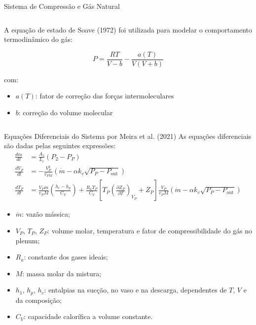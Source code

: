 \begin{frame}{Sistema de Compressão e Gás Natural}
\begin{columns}[T]
\begin{column}{0.52\textwidth}
            \vspace{0.15cm}
            A equação de estado de Soave (1972) foi utilizada para modelar o comportamento termodinâmico do gás:

            \[
            P = \frac{R T}{V - b} - \frac{a(T)}{V(V + b)}
            \]

            com:
            \begin{itemize}
                \item \( a(T) \): fator de correção das forças intermoleculares
                \item \( b \): correção do volume molecular
            \end{itemize}
        \end{column}
    \end{columns}
\end{frame}



\begin{frame}{Equações Diferenciais do Sistema por Meira et al. (2021)}
    As equações diferenciais são dadas pelas seguintes expressões:
    \begin{align}
        \frac{d\dot{m}}{dt} &= \frac{A_1}{L_c}(P_2 - P_P) \tag{1} \\
        \frac{dV_P}{dt} &= -\frac{V_P^2}{v_{PM}} \left( \dot{m} - \alpha k_v \sqrt{P_P - P_{\text{out}}} \right) \tag{2} \\
        \frac{dT_P}{dt} &= \frac{V_P \dot{m}}{v_P M} \left( \frac{h_c - h_p}{C_V} \right)
        + \frac{R_a T_P}{C_V} \left[ T_P \left( \frac{\partial Z_P}{\partial T} \right)_{V_P} + Z_P \right]
        \frac{V_P}{v_P M} \left( \dot{m} - \alpha k_v \sqrt{P_P - P_{\text{out}}} \right) \tag{3}
    \end{align}

    \vspace{0.1cm}

    \begin{itemize}
        \item \( \dot{m} \): vazão mássica;
        \item \( V_P \), \( T_P \), \( Z_P \): volume molar, temperatura e fator de compressibilidade do gás no plenum;
        \item \( R_a \): constante dos gases ideais;
        \item \( M \): massa molar da mistura;
        \item \( h_1 \), \( h_p \), \( h_c \): entalpias na sucção, no vaso e na descarga, dependentes de \( T \), \( V \) e da composição;
        \item \( C_V \): capacidade calorífica a volume constante.
    \end{itemize}

\end{frame}

